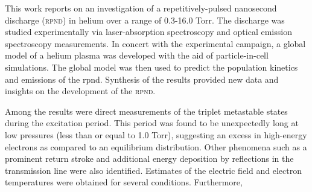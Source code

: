 This work reports on an investigation of a repetitively-pulsed nanosecond
discharge (\textsc{rpnd}) in helium over a range of 0.3-16.0 Torr. The discharge
was studied experimentally via laser-absorption spectroscopy and optical
emission spectroscopy measurements. In concert with the experimental campaign, a
global model of a helium plasma was developed with the aid of particle-in-cell
simulations. The global model was then used to predict the population kinetics
and emissions of the \acs{rpnd}. Synthesis of the results provided new data and
insights on the development of the \textsc{rpnd}.

Among the results were direct measurements of the triplet metastable states
during the excitation period. This period was found to be unexpectedly long at
low pressures (less than or equal to 1.0 Torr), suggesting an excess in
high-energy electrons as compared to an equilibrium distribution. Other
phenomena such as a prominent return stroke and additional energy deposition by
reflections in the transmission line were also identified. Estimates of the
electric field and electron temperatures were obtained for several conditions.
Furthermore,
